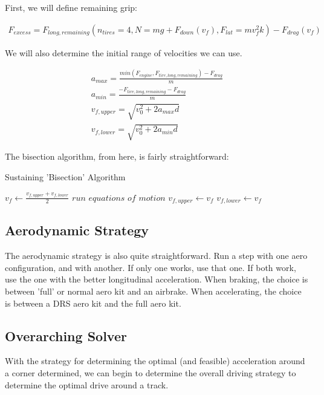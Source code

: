 \documentclass{article}
\begin{document}
First, we will define remaining grip:

\begin{align}
	F_{excess} = F_{long,remaining}(n_{tires} = 4, N = m g + F_{down}(v_f), F_{lat} = m v_f^2 k) - F_{drag}(v_f)
\end{align}

We will also determine the initial range of velocities we can use.

\begin{align}
	a_{max} = \frac{min(F_{engine},F_{tire,long,remaining})-F_{drag}}{m} \\
	a_{min} = \frac{-F_{tire,long,remaining}-F_{drag}}{m} \\
	v_{f,upper} = \sqrt{v_0^2 + 2 a_{max} d} \\
	v_{f,lower} = \sqrt{v_0^2 + 2 a_{min} d}
\end{align}

The bisection algorithm, from here, is fairly straightforward:

\begin{algorithm}[H]
\caption{Sustaining 'Bisection' Algorithm}
\begin{algorithmic}[1]
		\State $v_f \gets \frac{v_{f,upper}+v_{f,lower}}{2}$
		\State $run$ $equations$ $of$ $motion$
			\State $v_{f,upper} \gets v_{f}$
		\Else
			\State $v_{f,lower} \gets v_{f}$
		\EndIf
	\EndWhile
\end{algorithmic}
\end{algorithm}

\subsection{Aerodynamic Strategy}

The aerodynamic strategy is also quite straightforward. Run a step with one aero configuration, and with another. If only one works, use that one. If both work, use the one with the better longitudinal acceleration. When braking, the choice is between 'full' or normal aero kit and an airbrake. When accelerating, the choice is between a DRS aero kit and the full aero kit.

\subsection{Overarching Solver}

With the strategy for determining the optimal (and feasible) acceleration around a corner determined, we can begin to determine the overall driving strategy to determine the optimal drive around a track.
\end{document}
